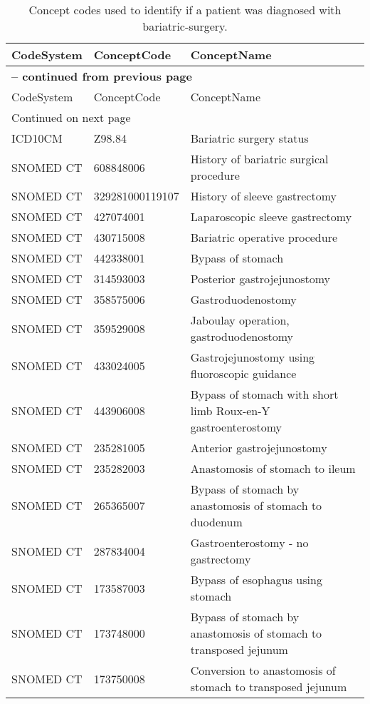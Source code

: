 \begin{longtable}{p{}p{}p{}}
\caption{Concept codes used to identify if a patient was diagnosed with bariatric-surgery.} \\ 
 CodeSystem & ConceptCode & ConceptName \\ 
  \hline 
\endfirsthead 
\multicolumn{3}{p{\textwidth}}{{ \bfseries \tablename \thetable{} -- continued from previous page}} \\ 
\hline CodeSystem & ConceptCode & ConceptName \\ \hline 
\endhead 
\hline \multicolumn{3}{p{\textwidth}}{{Continued on next page}} \\ \hline 
\endfoot 
\hline 
\endlastfoot 
 \hline
ICD10CM & Z98.84 & Bariatric surgery status \\ 
  SNOMED CT & 608848006 & History of bariatric surgical procedure \\ 
  SNOMED CT & 329281000119107 & History of sleeve gastrectomy \\ 
  SNOMED CT & 427074001 & Laparoscopic sleeve gastrectomy \\ 
  SNOMED CT & 430715008 & Bariatric operative procedure \\ 
  SNOMED CT & 442338001 & Bypass of stomach \\ 
  SNOMED CT & 314593003 & Posterior gastrojejunostomy \\ 
  SNOMED CT & 358575006 & Gastroduodenostomy \\ 
  SNOMED CT & 359529008 & Jaboulay operation, gastroduodenostomy \\ 
  SNOMED CT & 433024005 & Gastrojejunostomy using fluoroscopic guidance \\ 
  SNOMED CT & 443906008 & Bypass of stomach with short limb Roux-en-Y gastroenterostomy \\ 
  SNOMED CT & 235281005 & Anterior gastrojejunostomy \\ 
  SNOMED CT & 235282003 & Anastomosis of stomach to ileum \\ 
  SNOMED CT & 265365007 & Bypass of stomach by anastomosis of stomach to duodenum \\ 
  SNOMED CT & 287834004 & Gastroenterostomy - no gastrectomy \\ 
  SNOMED CT & 173587003 & Bypass of esophagus using stomach \\ 
  SNOMED CT & 173748000 & Bypass of stomach by anastomosis of stomach to transposed jejunum \\ 
  SNOMED CT & 173750008 & Conversion to anastomosis of stomach to transposed jejunum \\ 

\end{longtable}
